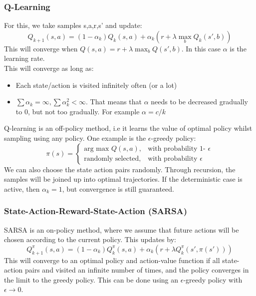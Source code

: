 \documentclass{article}
\begin{document}
\subsubsection{Q-Learning}
For this, we take samples s,a,r,s' and update:
\[
Q_{k+1}(s,a) = (1- \alpha_k)Q_k(s,a) + \alpha_k(r + \lambda \max_b Q_k(s',b))
\]
This will converge when $Q(s,a) = r + \lambda \max_b Q(s',b)$. In this case $\alpha$ is the learning rate. \\
This will converge as long as:
\begin{itemize}
    \item Each state/action is visited infinitely often (or a lot)
    \item $\sum \alpha_k = \infty, \sum \alpha_k^2 < \infty$. That means that $\alpha$ needs to be decreased gradually to 0, but not too gradually. For example $\alpha = c/k$
\end{itemize}
Q-learning is an off-policy method, i.e it learns the value of optimal policy whilst sampling using any policy. One example is the $\epsilon$-greedy policy:
\[
\pi(s) = \begin{cases}
    \text{arg max } Q(s,a), & \text{with probability 1- $\epsilon$} \\
    \text{randomly selected,} & \text{with probability $\epsilon$}
\end{cases}
\]
We can also choose the state action pairs randomly. Through recursion, the samples will be joined up into optimal trajectories. If the deterministic case is active, then $\alpha_k = 1$, but convergence is still guaranteed.
\subsubsection{State-Action-Reward-State-Action (SARSA)}
SARSA is an on-policy method, where we assume that future actions will be chosen according to the current policy. This updates by:
\[
Q_{k+1}^\pi(s,a) = (1-\alpha_k)Q_k^\pi(s,a) + \alpha_k(r + \lambda Q_k^\pi(s',\pi(s')))
\]
This will converge to an optimal policy and action-value function if all state-action pairs and visited an infinite number of times, and the policy converges in the limit to the greedy policy. This can be done using an $\epsilon$-greedy policy with $\epsilon \rightarrow 0$.
\end{document}
